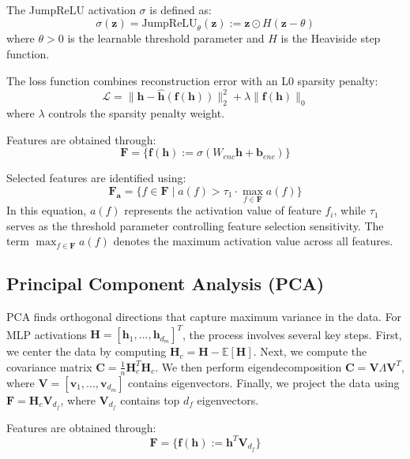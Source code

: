 The JumpReLU activation $\sigma$ is defined as:
\begin{equation}
    \sigma(\mathbf{z}) = \text{JumpReLU}_{\theta}(\mathbf{z}) := \mathbf{z} \odot H(\mathbf{z} - \theta)
\end{equation}
where $\theta > 0$ is the learnable threshold parameter and $H$ is the Heaviside step function.

The loss function combines reconstruction error with an L0 sparsity penalty:
\begin{equation}
    \mathcal{L} = \|\mathbf{h} - \hat{\mathbf{h}}(\mathbf{f}(\mathbf{h}))\|_2^2 + \lambda\|\mathbf{f}(\mathbf{h})\|_0
\end{equation}
where $\lambda$ controls the sparsity penalty weight.

Features are obtained through:
\begin{equation}
    \mathbf{F} = \{\mathbf{f}(\mathbf{h}) := \sigma(W_{enc}\mathbf{h} + \mathbf{b}_{enc})\}
\end{equation}

Selected features are identified using:
\begin{equation}
\label{identifyFa}
    \mathbf{F_{a}} = \{f \in \mathbf{F} \mid a(f) > \tau_1 \cdot \max_{f \in \mathbf{F}} a(f)\}
\end{equation}
In this equation, $a(f)$ represents the activation value of feature $f_i$, while $\tau_1$ serves as the threshold parameter controlling feature selection sensitivity. The term $\max_{f \in \mathbf{F}} a(f)$ denotes the maximum activation value across all features.

\subsection{Principal Component Analysis (PCA)}
PCA finds orthogonal directions that capture maximum variance in the data. For MLP activations $\mathbf{H} = [\mathbf{h}_1, ..., \mathbf{h}_{d_m}]^T$, the process involves several key steps. First, we center the data by computing $\mathbf{H}_c = \mathbf{H} - \mathbb{E}[\mathbf{H}]$. Next, we compute the covariance matrix $\mathbf{C} = \frac{1}{n}\mathbf{H}_c^T\mathbf{H}_c$. We then perform eigendecomposition $\mathbf{C} = \mathbf{V}\Lambda\mathbf{V}^T$, where $\mathbf{V} = [\mathbf{v}_1, ..., \mathbf{v}_{d_m}]$ contains eigenvectors. Finally, we project the data using $\mathbf{F} = \mathbf{H}_c\mathbf{V}_{d_f}$, where $\mathbf{V}_{d_f}$ contains top $d_f$ eigenvectors.

Features are obtained through:
\begin{equation}
    \mathbf{F} = \{\mathbf{f}(\mathbf{h}) := \mathbf{h}^T\mathbf{V}_{d_f}\}
\end{equation}

